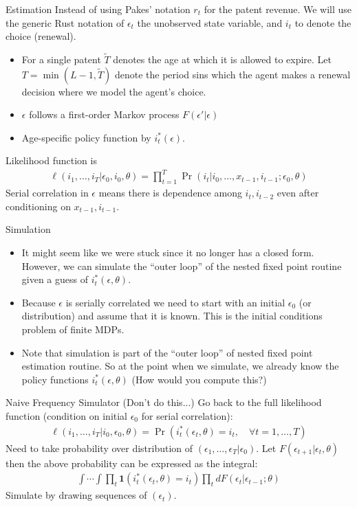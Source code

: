 \begin{frame}{Estimation}
Instead of using Pakes' notation $r_t$ for the patent revenue. We will use the generic Rust notation of $\epsilon_t$ the unobserved state variable, and $i_t$ to denote the choice (renewal).
\begin{itemize}
\item For a single patent $\tilde{T}$ denotes the age at which it is allowed to expire. Let $T = \min(L-1,\tilde{T})$ denote the period sins which the agent makes a renewal decision where we model the agent's choice.
\item $\epsilon$ follows a first-order Markov process $F(\epsilon' | \epsilon)$
\item Age-specific policy function by $i^*_t(\epsilon)$.
\end{itemize}
Likelihood function is 
\begin{eqnarray*}
\ell(i_1,\ldots,i_T | \epsilon_0,i_0,\theta) = \prod_{t=1}^T \Pr(i_t | i_0, \ldots,  x_{t-1}, i_{t-1} ; \epsilon_0, \theta)
\end{eqnarray*}
Serial correlation in $\epsilon$ means there is dependence among $i_{t}, i_{t-2}$ even after conditioning on $x_{t-1},i_{t-1}$. 
\end{frame}

\begin{frame}{Simulation}
\begin{itemize}
\item It might seem like we were stuck since it no longer has a closed form.  However, we can simulate the ``outer loop'' of the nested fixed point routine given a guess  of $i^*_t(\epsilon,\theta)$.
\item Because $\epsilon$ is serially correlated we need to start with an initial $\epsilon_0$ (or distribution) and assume that it is known.  This is the \alert{initial conditions problem} of finite MDPs.
\item Note that simulation is part of the ``outer loop'' of nested fixed point estimation routine. So at the point when we simulate, we already know the policy functions $i_t^{*}(\epsilon,\theta)$ (How would you compute this?)
\end{itemize}
\end{frame}

\begin{frame}{Naive Frequency Simulator (Don't do this...)}
Go back to the full likelihood function (condition on initial $\epsilon_0$ for serial correlation):
\begin{align*}
\ell(i_1,\ldots,i_T | i_0, \epsilon_0, \theta) = \Pr(i_t^{*} (\epsilon_t,\theta) = i_t, \quad \forall t =1,\ldots,T)
\end{align*}
Need to take probability over distribution of $(\epsilon_1,\ldots,\epsilon_T | \epsilon_0)$.  Let $F(\epsilon_{t+1} | \epsilon_t,\theta)$ then the above probability can be expressed as the integral:
\begin{align*}
\int \cdots \int \prod_t \symbf{1}(i_t^{*}(\epsilon_t,\theta) = i_t) \prod_t d F(\epsilon_t | \epsilon_{t-1}; \theta)
\end{align*}
Simulate by drawing sequences of $(\epsilon_t)$.
\end{frame}


